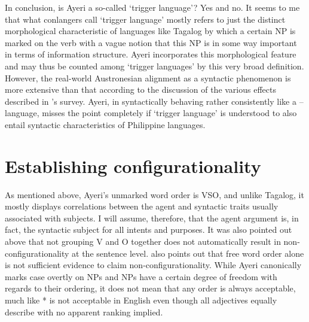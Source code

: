 In conclusion, is Ayeri a so-called `trigger language'? Yes and no. It seems to
me that what conlangers call `trigger language' mostly refers to just the
distinct morphological characteristic of languages like Tagalog by which a
certain NP is marked on the verb with a vague notion that this NP is in some
way important in terms of information structure. Ayeri incorporates this
morphological feature and may thus be counted among `trigger languages' by this
very broad definition. However, the real-world Austronesian alignment as a
syntactic phenomenon is more extensive than that according to the discussion of
the various effects described in \citet{kroeger1991}'s survey. Ayeri, in
syntactically behaving rather consistently like a \Nom{}--\Acc{} language,
misses the point completely if `trigger language' is understood to also entail
syntactic characteristics of Philippine languages.

\section{Establishing configurationality}
\label{sec:config}

As mentioned above, Ayeri's unmarked word order is VSO, and unlike Tagalog, it
mostly displays correlations between the agent and syntactic traits usually
associated with subjects. I will assume, therefore, that the agent argument is,
in fact, the syntactic subject for all intents and purposes. It was also
pointed out above that not grouping V and O together does not automatically
result in non-configurationality at the sentence level. \citet[128]{speas1990}
also points out that free word order alone is not sufficient evidence to claim
non-configurationality. While Ayeri canonically marks case overtly on NPs and NPs have
a certain degree of freedom with regards to their ordering, it does not mean
that any order is always acceptable, much like * is not acceptable in English even though all adjectives equally
describe  with no apparent ranking implied.

